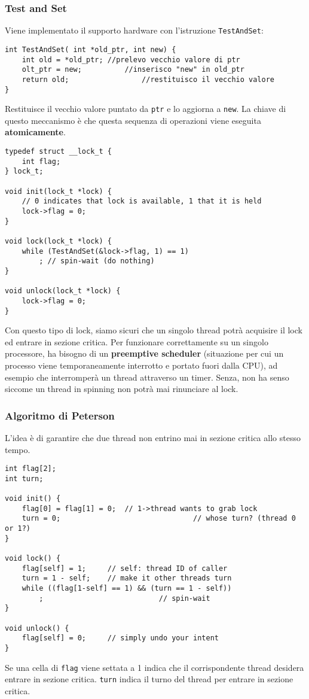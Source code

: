 \documentclass[12pt, letterpaper]{article}
\begin{document}
			\subsubsection{Test and Set}
				Viene implementato il supporto hardware con l'istruzione \texttt{TestAndSet}:
				\begin{lstlisting}[style=CStyle]
int TestAndSet( int *old_ptr, int new) {
	int old = *old_ptr; //prelevo vecchio valore di ptr
	olt_ptr = new;			//inserisco "new" in old_ptr
	return old;					//restituisco il vecchio valore
}				\end{lstlisting}
				Restituisce il vecchio valore puntato da \texttt{ptr} e lo aggiorna a \texttt{new}. La chiave di questo meccanismo è che questa sequenza di operazioni viene eseguita \textbf{atomicamente}. 
				\begin{lstlisting}[style=CStyle]
typedef struct __lock_t {
	int flag;
} lock_t;

void init(lock_t *lock) {
	// 0 indicates that lock is available, 1 that it is held
	lock->flag = 0;
}

void lock(lock_t *lock) {
	while (TestAndSet(&lock->flag, 1) == 1)
		; // spin-wait (do nothing)
}

void unlock(lock_t *lock) {
	lock->flag = 0;
}				\end{lstlisting}
				Con questo tipo di lock, siamo sicuri che un singolo thread potrà acquisire il lock ed entrare in sezione critica. Per funzionare correttamente su un singolo processore, ha bisogno di un \textbf{preemptive scheduler} (situazione per cui un processo viene temporaneamente interrotto e portato fuori dalla CPU), ad esempio che interromperà un thread attraverso un timer. Senza, non ha senso siccome un thread in spinning non potrà mai rinunciare al lock.
				
			\subsubsection{Algoritmo di Peterson}
				L'idea è di garantire che due thread non entrino mai in sezione critica allo stesso tempo.
				\begin{lstlisting}[style=CStyle]
int flag[2];
int turn;

void init() {
	flag[0] = flag[1] = 0;	// 1->thread wants to grab lock
	turn = 0;								// whose turn? (thread 0 or 1?)
}

void lock() {
	flag[self] = 1;		// self: thread ID of caller
	turn = 1 - self;	// make it other threads turn
	while ((flag[1-self] == 1) && (turn == 1 - self))
		; 							// spin-wait
}

void unlock() {
	flag[self] = 0;		// simply undo your intent
}				\end{lstlisting}
				Se una cella di \texttt{flag} viene settata a 1 indica che il corrispondente thread desidera entrare in sezione critica. \texttt{turn} indica il turno del thread per entrare in sezione critica.
				
\end{document}
